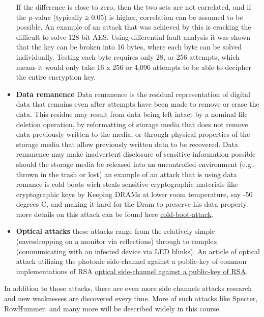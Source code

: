 \begin{itemize}
    If the difference is close to zero, then the two sets are not correlated, and if the p-value (typically ≥ 0.05) is higher, correlation can be assumed to be possible.
    An example of an attack that was achieved by this is cracking the difficult-to-solve 128-bit AES. 
    Using differential fault analysis it was shown that the key can be broken into 16 bytes, where each byte can be solved individually.
    Testing each byte requires only 28, or 256 attempts, which means it would only take 16 x 256 or 4,096 attempts to be able to decipher the entire encryption key. 
    \item \textbf{Data remanence} Data remanence is the residual representation of digital data that remains even after attempts have been made to remove or erase the data.
    This residue may result from data being left intact by a nominal file deletion operation, by reformatting of storage media that does not remove data previously written to the media,
    or through physical properties of the storage media that allow previously written data to be recovered.
    Data remanence may make inadvertent disclosure of sensitive information possible should the storage media be released into an uncontrolled environment (e.g., thrown in the trash or lost)
    an example of an attack that is using data romance is cold boots wich steals sensitive cryptographic materials like cryptographic keys by Keeping DRAMs at lower room temperature,
    say -50 degrees C, and making it hard for the Dram to preserve his data properly.
    more details on this attack can be found here \href{https://resources.infosecinstitute.com/cold-boot-attack/#gref}{cold-boot-attack}.
    \item \textbf{Optical attacks} these attacks range from the relatively simple (eavesdropping on a monitor via reflections) through to complex (communicating with an infected device via LED blinks). 
    An article of optical attack utilizing the photonic side-channel against a public-key of common implementations of RSA \href{https://www.eng.tau.ac.il/~yash/ieee-host-2017.pdf}{optical side-channel against a public-key of RSA}.
\end{itemize}

In addition to those attacks, there are even more side channels attacks research and new weaknesses are discovered every time.
More of such attacks like Specter, RowHummer, and many more will be described widely in this course.
  
    



